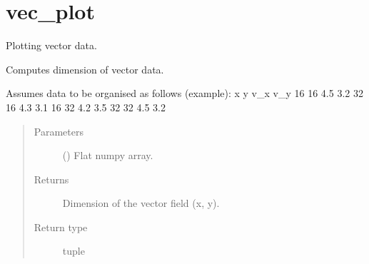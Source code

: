 \documentclass[letterpaper,10pt,english]{sphinxmanual}
\begin{document}
\section{vec\_plot}
\label{\detokenize{vec_plot:module-openpivgui.vec_plot}}\label{\detokenize{vec_plot:vec-plot}}\label{\detokenize{vec_plot::doc}}
Plotting vector data.

\begin{fulllineitems}
\label{\detokenize{vec_plot:openpivgui.vec_plot.get_dim}}
Computes dimension of vector data.

Assumes data to be organised as follows (example):
x  y  v\_x v\_y
16 16 4.5 3.2
32 16 4.3 3.1
16 32 4.2 3.5
32 32 4.5 3.2
\begin{quote}\begin{description}
\item[{Parameters}] \leavevmode
{} () \textendash{} Flat numpy array.

\item[{Returns}] \leavevmode
Dimension of the vector field (x, y).

\item[{Return type}] \leavevmode
tuple

\end{description}\end{quote}

\end{fulllineitems}

\end{document}
